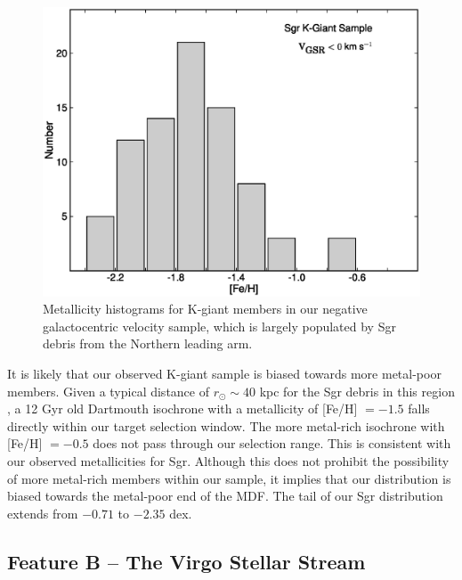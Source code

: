 \documentclass[preprint2]{aastex}
\begin{document}
	\begin{figure}[h]
		\includegraphics[width=\columnwidth]{./sgr_feh_hist.eps}
		\caption{Metallicity histograms for K-giant members in our negative galactocentric velocity sample, which is largely populated by Sgr debris from the Northern leading arm.}
		\label{fig:sgr-metallicity-hist}
	\end{figure}

	It is likely that our observed K-giant sample is biased towards more metal-poor members. Given a typical distance of $r_\odot\sim 40$ kpc for the Sgr debris in this region \citep{Belokurov;et-al_2006}, a 12 Gyr old Dartmouth \citep{Dotter;et-al_2008} isochrone with a metallicity of [Fe/H] $= -1.5$ falls directly within our target selection window. The more metal-rich isochrone with [Fe/H] $= -0.5$ does not pass through our selection range. This is consistent with our observed metallicities for Sgr. Although this does not prohibit the possibility of more metal-rich members within our sample, it implies that our distribution is biased towards the metal-poor end of the MDF. The tail of our Sgr distribution extends from $-0.71$ to $-2.35$ dex.

	\subsection{Feature B \--- The Virgo Stellar Stream}
	\label{sec:the-vss}
	
\end{document}
